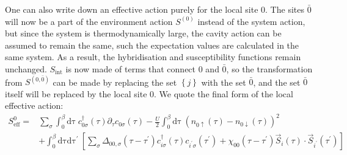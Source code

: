 \documentclass[reprint,hidelinks,onecolumn]{revtex4-2}
\begin{document}
One can also write down an effective action purely for the local site \(0\). The sites \(\bar 0\) will now be a part of the environment action \(S^{(0)}\) instead of the system action, but since the system is thermodynamically large, the cavity action can be assumed to remain the same, such the expectation values are calculated in the same system. As a result, the hybridisation and susceptibility functions remain unchanged. \(S_\text{int}\) is now made of terms that connect \(0\) and \(\bar 0\), so the transformation from \(S^{(0,\bar 0)}\) can be made by replacing the set \(\left\{ j \right\} \) with the set \(\bar 0\), and the set \(\bar 0\) itself will be replaced by the local site \(0\). We quote the final form of the local effective action:
\begin{equation}\begin{aligned}
	S^{0}_\text{eff} =& \sum_\sigma \int_0^\beta\mathrm{d\tau}~c^\dagger_{0\sigma}(\tau)\partial_\tau c_{0\sigma}(\tau) - \frac{U}{2}\int_0^\beta\mathrm{d\tau}~\left(n_{0\uparrow}(\tau) - n_{0\downarrow}(\tau)\right)^2 \\
			  &+ \int_0^\beta\mathrm{d\tau}\mathrm{d\tau^\prime}~\left[\sum_{\sigma}\Delta_{00,\sigma}(\tau - \tau^\prime)c^\dagger_{i\sigma}(\tau)c_{i^\prime\sigma}(\tau^\prime) + \chi_{00}(\tau - \tau^\prime)\vec{S}_{i}(\tau)\cdot\vec{S}_{i^\prime}(\tau^\prime)\right]
\end{aligned}\end{equation}
\end{document}
